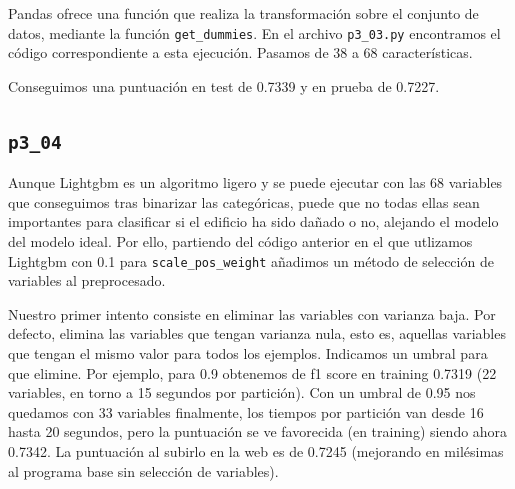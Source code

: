 \documentclass[a4paper, 20pt]{article}
\begin{document}
Pandas ofrece una función que realiza la transformación sobre el conjunto de datos, mediante la función \texttt{get\_dummies}. En el archivo \texttt{p3\_03.py} encontramos el código correspondiente a esta ejecución. Pasamos de 38 a 68 características.

Conseguimos una puntuación en test de 0.7339 y en prueba de 0.7227.

\subsection{\texttt{p3\_04}}

Aunque Lightgbm es un algoritmo ligero y se puede ejecutar con las 68 variables que conseguimos tras binarizar las categóricas, puede que no todas ellas sean importantes para clasificar si el edificio ha sido dañado o no, alejando el modelo del modelo ideal. Por ello, partiendo del código anterior en el que utlizamos Lightgbm con 0.1 para \texttt{scale\_pos\_weight} añadimos un método de selección de variables al preprocesado.

Nuestro primer intento consiste en eliminar las variables con varianza baja. Por defecto, elimina las variables que tengan varianza nula, esto es, aquellas variables que tengan el mismo valor para todos los ejemplos. Indicamos un umbral para que elimine. Por ejemplo, para 0.9 obtenemos de f1 score en training 0.7319 (22 variables, en torno a 15 segundos por partición). Con un umbral de 0.95 nos quedamos con 33 variables finalmente, los tiempos por partición van desde 16 hasta 20 segundos, pero la puntuación se ve favorecida (en training) siendo ahora 0.7342. La puntuación al subirlo en la web es de 0.7245 (mejorando en milésimas al programa base sin selección de variables).
\end{document}
